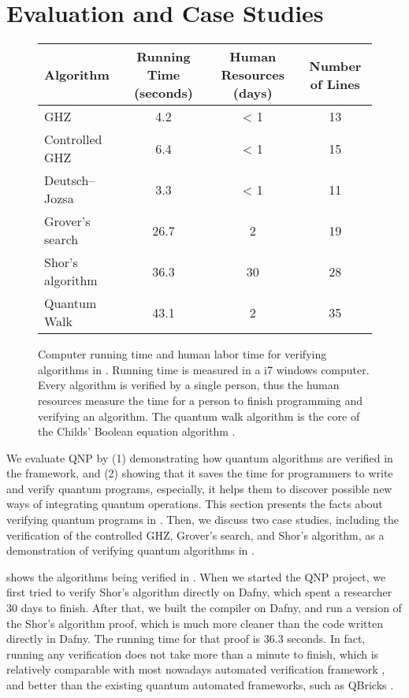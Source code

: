 \section{\qafny Evaluation and Case Studies}
\label{sec:arith-oqasm}

\begin{figure*}[t]
{\small
\begin{tabular}{|l|c|c|c|}
\hline
Algorithm & Running Time (seconds)  & Human Resources (days) & Number of Lines \\
                     \hline
GHZ & 4.2 & < 1 & 13 \\
Controlled GHZ & 6.4 & < 1 & 15  \\
Deutsch–Jozsa & 3.3 & < 1 & 11 \\
Grover's search & 26.7 &  2 & 19 \\
Shor's algorithm & 36.3 & 30 & 28  \\
Quantum Walk & 43.1 & 2 & 35 \\
\hline                           
\end{tabular}
}
\caption{Computer running time and human labor time for verifying algorithms in \qafny. Running time is measured in a i7 windows computer. Every algorithm is verified by a single person, thus the human resources measure the time for a person to finish programming and verifying an algorithm. The quantum walk algorithm is the core of the Childs' Boolean equation algorithm \cite{ChildsNAND}.}
\label{fig:circ-evaluation}
\end{figure*}

We evaluate QNP by (1) demonstrating how quantum algorithms are verified in the framework, and (2) showing that it saves the time for programmers to write and verify quantum programs, especially, it helps them to discover possible new ways of integrating quantum operations.
%
This section presents the facts about verifying quantum programs in \qafny. Then, we discuss two case studies, including the verification of the controlled GHZ, Grover's search, and Shor's algorithm, as a demonstration of verifying quantum algorithms in \qafny.

 shows the algorithms being verified in \qafny. When we started the QNP project, we first tried to verify Shor's algorithm directly on Dafny, which spent a researcher 30 days to finish. After that, we built the \qafny compiler on Dafny, and run a \qafny version of the Shor's algorithm proof, which is much more cleaner than the code written directly in Dafny. The running time for that proof is 36.3 seconds. In fact, running any \qafny verification does not take more than a minute to finish, which is relatively comparable with most nowadays automated verification framework \cite{DBLP:conf/pldi/Qiu0SM13,dafnyref}, and better than the existing quantum automated frameworks, such as QBricks \cite{qbricks}.

